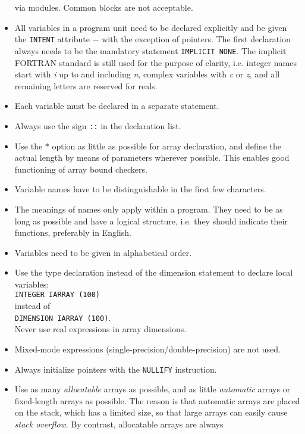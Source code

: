 \documentclass[12pt]{book}
\begin{document}
\begin{itemize}
        via modules. Common blocks are not acceptable.
  \item All variables in a program unit need to be declared explicitly and be given the {\tt INTENT} attribute
        $-$ with the exception of pointers. The first declaration always needs to be the mandatory statement
        {\tt IMPLICIT NONE}. The implicit FORTRAN standard is still used for the purpose of clarity, i.e. integer
        names start with \textit{i} up to and including \textit{n}, complex variables with \textit{c} or \textit{z},
        and all remaining letters are reserved for reals.
  \item Each variable must be declared in a separate statement.
  \item Always use the sign {\tt ::} in the declaration list.
  \item Use the $*$ option as little as possible for array declaration, and define the actual length by means
        of parameters wherever possible. This enables good functioning of array bound checkers.
  \item Variable names have to be distinguishable in the first few characters.
  \item The meanings of names only apply within a program. They need to be as long as possible and have a logical structure,
        i.e. they should indicate their functions, preferably in English.
  \item Variables need to be given in alphabetical order.
  \item Use the type declaration instead of the dimension statement to declare local variables:
        \\[2ex]
        \noindent
        {\tt INTEGER IARRAY (100)}
        \\[2ex]
        \noindent
        instead of
        \\[2ex]
        \noindent
        {\tt DIMENSION IARRAY (100)}.
        \\[2ex]
        \noindent
        Never use real expressions in array dimensions.
  \item Mixed-mode expressions (single-precision/double-precision) are not used.
  \item Always initialize pointers with the {\tt NULLIFY} instruction.
  \item Use as many \textit{allocatable} arrays as possible, and as little \textit{automatic} arrays or fixed-length arrays as
        possible. The reason is that automatic arrays are placed on the stack, which has a limited size,
        so that large arrays can easily cause \textit{stack overflow}. By contrast, allocatable arrays are always

\end{itemize}
\end{document}
